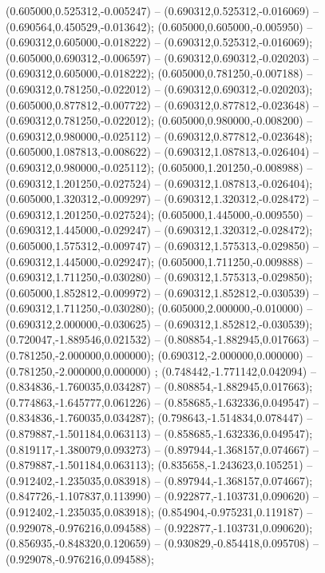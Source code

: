  (0.605000,0.525312,-0.005247) -- (0.690312,0.525312,-0.016069) -- (0.690564,0.450529,-0.013642);
 (0.605000,0.605000,-0.005950) -- (0.690312,0.605000,-0.018222) -- (0.690312,0.525312,-0.016069);
 (0.605000,0.690312,-0.006597) -- (0.690312,0.690312,-0.020203) -- (0.690312,0.605000,-0.018222);
 (0.605000,0.781250,-0.007188) -- (0.690312,0.781250,-0.022012) -- (0.690312,0.690312,-0.020203);
 (0.605000,0.877812,-0.007722) -- (0.690312,0.877812,-0.023648) -- (0.690312,0.781250,-0.022012);
 (0.605000,0.980000,-0.008200) -- (0.690312,0.980000,-0.025112) -- (0.690312,0.877812,-0.023648);
 (0.605000,1.087813,-0.008622) -- (0.690312,1.087813,-0.026404) -- (0.690312,0.980000,-0.025112);
 (0.605000,1.201250,-0.008988) -- (0.690312,1.201250,-0.027524) -- (0.690312,1.087813,-0.026404);
 (0.605000,1.320312,-0.009297) -- (0.690312,1.320312,-0.028472) -- (0.690312,1.201250,-0.027524);
 (0.605000,1.445000,-0.009550) -- (0.690312,1.445000,-0.029247) -- (0.690312,1.320312,-0.028472);
 (0.605000,1.575312,-0.009747) -- (0.690312,1.575313,-0.029850) -- (0.690312,1.445000,-0.029247);
 (0.605000,1.711250,-0.009888) -- (0.690312,1.711250,-0.030280) -- (0.690312,1.575313,-0.029850);
 (0.605000,1.852812,-0.009972) -- (0.690312,1.852812,-0.030539) -- (0.690312,1.711250,-0.030280);
 (0.605000,2.000000,-0.010000) -- (0.690312,2.000000,-0.030625) -- (0.690312,1.852812,-0.030539);
 (0.720047,-1.889546,0.021532) -- (0.808854,-1.882945,0.017663) -- (0.781250,-2.000000,0.000000);
 (0.690312,-2.000000,0.000000) -- (0.781250,-2.000000,0.000000) ;
 (0.748442,-1.771142,0.042094) -- (0.834836,-1.760035,0.034287) -- (0.808854,-1.882945,0.017663);
 (0.774863,-1.645777,0.061226) -- (0.858685,-1.632336,0.049547) -- (0.834836,-1.760035,0.034287);
 (0.798643,-1.514834,0.078447) -- (0.879887,-1.501184,0.063113) -- (0.858685,-1.632336,0.049547);
 (0.819117,-1.380079,0.093273) -- (0.897944,-1.368157,0.074667) -- (0.879887,-1.501184,0.063113);
 (0.835658,-1.243623,0.105251) -- (0.912402,-1.235035,0.083918) -- (0.897944,-1.368157,0.074667);
 (0.847726,-1.107837,0.113990) -- (0.922877,-1.103731,0.090620) -- (0.912402,-1.235035,0.083918);
 (0.854904,-0.975231,0.119187) -- (0.929078,-0.976216,0.094588) -- (0.922877,-1.103731,0.090620);
 (0.856935,-0.848320,0.120659) -- (0.930829,-0.854418,0.095708) -- (0.929078,-0.976216,0.094588);
